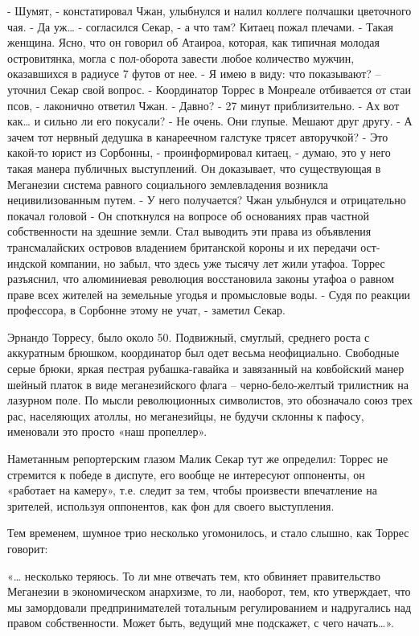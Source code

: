 \documentclass[10pt,final]{book}
\begin{document}
- Шумят, - констатировал Чжан, улыбнулся и налил коллеге полчашки цветочного чая.
- Да уж\ldots{} - согласился Секар, - а что там?
Китаец пожал плечами.
- Такая женщина.
Ясно, что он говорил об Атаироа, которая, как типичная молодая островитянка, могла с пол-оборота завести любое количество мужчин, оказавшихся в радиусе 7 футов от нее.
- Я имею в виду: что показывают? -- уточнил Секар свой вопрос.
- Координатор Торрес в Монреале отбивается от стаи псов, - лаконично ответил Чжан.
- Давно?
- 27 минут приблизительно.
- Ах вот как\ldots{} и сильно ли его покусали?
- Не очень. Они глупые. Мешают друг другу.
- А зачем тот нервный дедушка в канареечном галстуке трясет авторучкой?
- Это какой-то юрист из Сорбонны, - проинформировал китаец, - думаю, это у него такая манера публичных выступлений. Он доказывает, что существующая в Меганезии система равного социального землевладения возникла нецивилизованным путем.
- У него получается?
Чжан улыбнулся и отрицательно покачал головой
- Он споткнулся на вопросе об основаниях прав частной собственности на здешние земли. Стал выводить эти права из объявления трансмалайских островов владением британской короны и их передачи ост-индской компании, но забыл, что здесь уже тысячу лет жили утафоа. Торрес разъяснил, что алюминиевая революция восстановила законы утафоа о равном праве всех жителей на земельные угодья и промысловые воды.
- Судя по реакции профессора, в Сорбонне этому не учат, - заметил Секар.

Эрнандо Торресу, было около 50. Подвижный, смуглый, среднего роста с аккуратным брюшком, координатор был одет весьма неофициально. Свободные серые брюки, яркая пестрая рубашка-гавайка и завязанный на ковбойский манер шейный платок в виде меганезийского флага -- черно-бело-желтый трилистник на лазурном поле. По мысли революционных символистов, это обозначало союз трех рас, населяющих атоллы, но меганезийцы, не будучи склонны к пафосу, именовали это просто «наш пропеллер».

Наметанным репортерским глазом Малик Секар тут же определил: Торрес не стремится к победе в диспуте, его вообще не интересуют оппоненты, он «работает на камеру», т.е. следит за тем, чтобы произвести впечатление на зрителей, используя оппонентов, как фон для своего выступления.

Тем временем, шумное трио несколько угомонилось, и стало слышно, как Торрес говорит:

«\ldots{} несколько теряюсь. То ли мне отвечать тем, кто обвиняет правительство Меганезии в экономическом анархизме, то ли, наоборот, тем, кто утверждает, что мы замордовали предпринимателей тотальным регулированием и надругались над правом собственности. Может быть, ведущий мне подскажет, с чего начать\ldots{}».
\end{document}
